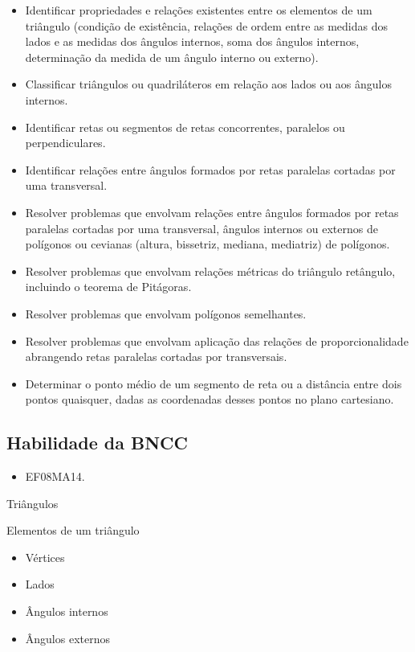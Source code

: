 \begin{itemize}
\item Identificar propriedades e relações existentes
entre os elementos de um triângulo (condição de existência, relações de
ordem entre as medidas dos lados e as medidas dos ângulos internos, soma
dos ângulos internos, determinação da medida de um ângulo interno ou
externo).
\item
  Classificar triângulos ou quadriláteros em relação aos lados ou aos
  ângulos internos.
\item
  Identificar retas ou segmentos de retas concorrentes, paralelos ou
  perpendiculares.
\item
  Identificar relações entre ângulos formados por retas paralelas
  cortadas por uma transversal.
\item
  Resolver problemas que envolvam relações entre ângulos formados por
  retas paralelas cortadas por uma transversal, ângulos internos ou
  externos de polígonos ou cevianas (altura, bissetriz, mediana,
  mediatriz) de polígonos.
\item
  Resolver problemas que envolvam relações métricas do triângulo
  retângulo, incluindo o teorema de Pitágoras.
\item
  Resolver problemas que envolvam polígonos semelhantes.
\item
  Resolver problemas que envolvam aplicação das relações de
  proporcionalidade abrangendo retas paralelas cortadas por
  transversais.
\item
  Determinar o ponto médio de um segmento de reta ou a distância entre
  dois pontos quaisquer, dadas as coordenadas desses pontos no plano
  cartesiano.
\end{itemize}

\subsection{Habilidade da BNCC}

\begin{itemize}
\item EF08MA14.
\end{itemize}

Triângulos

Elementos de um triângulo

\begin{itemize}
\item
  Vértices
\item
  Lados
\item
  Ângulos internos
\item
  Ângulos externos
\end{itemize}

